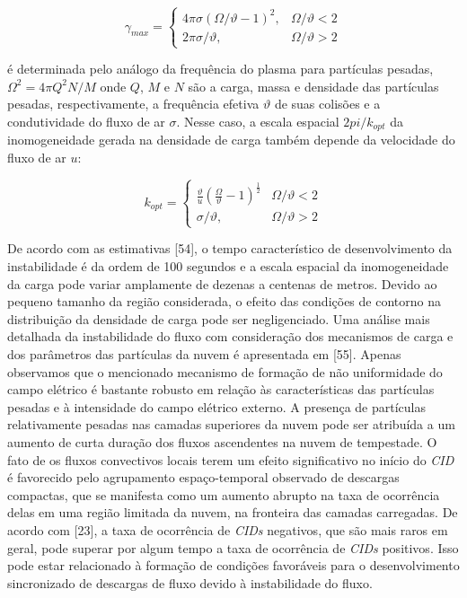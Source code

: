 \documentclass[a4paper, 12pt, onecolumn,singlespacing]{article}
\begin{document}
	\begin{equation}
		\gamma_{max} = \begin{cases}
							4\pi\sigma\left(\Omega/\vartheta-1\right)^2, & \Omega/\vartheta < 2 \\ 
							2\pi\sigma/\vartheta, & \Omega/\vartheta > 2 
					   \end{cases}
		\label{eqn_4}	
	\end{equation}

	é determinada pelo análogo da frequência do plasma para partículas pesadas,$\Omega^2 = 4\pi Q^2N/M$ onde $Q$, $M$ e $N$ são a carga, massa e densidade das partículas pesadas, respectivamente, a frequência efetiva $\vartheta$ de suas colisões e a condutividade do fluxo de ar $\sigma$. Nesse caso, a escala espacial $2 pi /k_{opt}$ da inomogeneidade gerada na densidade de carga também depende da velocidade do fluxo de ar $u$:
	
	\begin{equation}
		k_{opt} = \begin{cases}
						\frac{\vartheta}{u} \left(\frac{\Omega}{\vartheta}-1\right)^{\frac{1}{2}}& \Omega/\vartheta < 2 \\ 
						\sigma/\vartheta, & \Omega/\vartheta > 2 
				  \end{cases}
				  \label{eqn_5}	
	\end{equation}

	De acordo com as estimativas [54], o tempo característico de desenvolvimento da instabilidade é da ordem de 100 segundos e a escala espacial da inomogeneidade da carga pode variar amplamente de dezenas a centenas de metros. Devido ao pequeno tamanho da região considerada, o efeito das condições de contorno na distribuição da densidade de carga pode ser negligenciado. Uma análise mais detalhada da instabilidade do fluxo com consideração dos mecanismos de carga e dos parâmetros das partículas da nuvem é apresentada em [55]. Apenas observamos que o mencionado mecanismo de formação de não uniformidade do campo elétrico é bastante robusto em relação às características das partículas pesadas e à intensidade do campo elétrico externo. A presença de partículas relativamente pesadas nas camadas superiores da nuvem pode ser atribuída a um aumento de curta duração dos fluxos ascendentes na nuvem de tempestade. O fato de os fluxos convectivos locais terem um efeito significativo no início do \textit{CID} é favorecido pelo agrupamento espaço-temporal observado de descargas compactas, que se manifesta como um aumento abrupto na taxa de ocorrência delas em uma região limitada da nuvem, na fronteira das camadas carregadas. De acordo com [23], a taxa de ocorrência de \textit{CIDs} negativos, que são mais raros em geral, pode superar por algum tempo a taxa de ocorrência de \textit{CIDs} positivos. Isso pode estar relacionado à formação de condições favoráveis para o desenvolvimento sincronizado de descargas de fluxo devido à instabilidade do fluxo.
	
\end{document}
